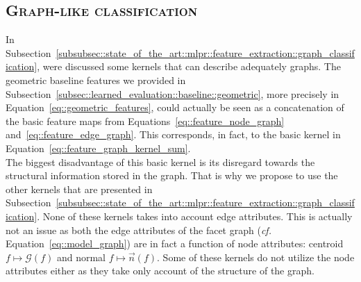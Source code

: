     \subsection{\textsc{Graph-like classification}}
        \label{subsec::learned_evaluation::richer_features::graph}
        In Subsection~\ref{subsubsec::state_of_the_art::mlpr::feature_extraction::graph_classification}, were discussed some kernels that can describe adequately graphs.
        The geometric baseline features we provided in Subsection~\ref{subsec::learned_evaluation::baseline::geometric}, more precisely in Equation~\ref{eq::geometric_features}, could actually be seen as a concatenation of the basic feature maps from Equations~\ref{eq::feature_node_graph} and~\ref{eq::feature_edge_graph}.
        This corresponds, in fact, to the basic kernel in Equation~\ref{eq::feature_graph_kernel_sum}.\\

        The biggest disadvantage of this basic kernel is its disregard towards the structural information stored in the graph.
        That is why we propose to use the other kernels that are presented in Subsection~\ref{subsubsec::state_of_the_art::mlpr::feature_extraction::graph_classification}.
        None of these kernels takes into account edge attributes.
        This is actually not an issue as both the edge attributes of the facet graph (\textit{cf.} Equation~\ref{eq::model_graph}) are in fact a function of node attributes: centroid \(f \mapsto \mathscr{G}\left(f\right)\) and normal \(f \mapsto \vec{n}\left(f\right)\).
        Some of these kernels do not utilize the node attributes either as they take only account of the structure of the graph.\\


